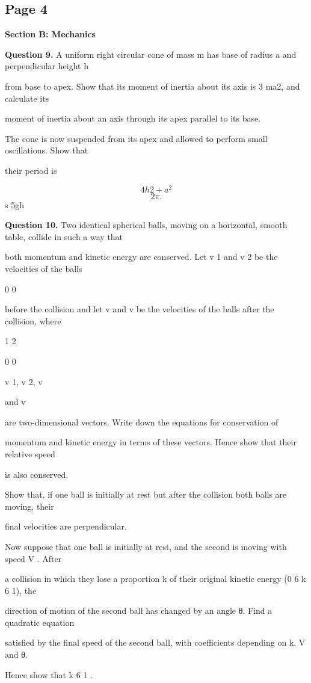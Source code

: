 \documentclass[12pt]{article}
\begin{document}
\subsection*{Page 4}
\begin{flushleft}
\bigskip\textbf{Section B: Mechanics}\par
\bigskip\textbf{Question 9.} A uniform right circular cone of mass m has base of radius a and perpendicular height h\par
from base to apex. Show that its moment of inertia about its axis is 3 ma2, and calculate its\par
moment of inertia about an axis through its apex parallel to its base.\par
[Any theorems used should be stated clearly.]\par
The cone is now suspended from its apex and allowed to perform small oscillations. Show that\par
their period is\par
\[4h2 + a^2\]
\[2\pi .\]
s 5gh\par
[You may assume that the centre of mass of the cone is a distance h from its apex.]\par
\bigskip\textbf{Question 10.} Two identical spherical balls, moving on a horizontal, smooth table, collide in such a way that\par
both momentum and kinetic energy are conserved. Let v 1 and v 2 be the velocities of the balls\par
0 0\par
before the collision and let v and v be the velocities of the balls after the collision, where\par
1 2\par
0 0\par
v 1, v 2, v\par
and v\par
are two-dimensional vectors. Write down the equations for conservation of\par
momentum and kinetic energy in terms of these vectors. Hence show that their relative speed\par
is also conserved.\par
Show that, if one ball is initially at rest but after the collision both balls are moving, their\par
final velocities are perpendicular.\par
Now suppose that one ball is initially at rest, and the second is moving with speed V . After\par
a collision in which they lose a proportion k of their original kinetic energy (0 6 k 6 1), the\par
direction of motion of the second ball has changed by an angle θ. Find a quadratic equation\par
satisfied by the final speed of the second ball, with coefficients depending on k, V and θ.\par
Hence show that k 6 1 .\par
\end{flushleft}
\end{document}

